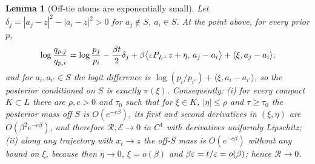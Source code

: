 \documentclass{article} %
\theoremstyle{plain}
\newtheorem{lemma}[theorem]{Lemma}
\theoremstyle{definition}
\theoremstyle{remark}
\begin{document}
\begin{lemma}[Off-tie atoms are exponentially small]
\label{lem:offtie}
Let $\delta_j=|a_j-z|^2-|a_i-z|^2>0$ for $a_j\notin S$, $a_i\in S$. At the point above, for every
prior $p$,
\[
\log\frac{q_{p,j}}{q_{p,i}}=\log\frac{p_j}{p_i}-\frac{\beta t}2\delta_j
+\beta\big\langle\varepsilon P_{L^\perp}z+\eta,\,a_j-a_i\big\rangle+\langle\xi,a_j-a_i\rangle,
\]
and for $a_i,a_{i'}\in S$ the logit difference is $\log(p_i/p_{i'})+\langle\xi,a_i-a_{i'}\rangle$, so the
posterior conditioned on $S$ is exactly $\pi(\xi)$. Consequently: (i) for every compact
$K\subset L$ there are $\rho,c>0$ and $\tau_0$ such that for $\xi\in K$, $|\eta|\le\rho$ and
$\tau\ge\tau_0$ the posterior mass off $S$ is $O(e^{-c\beta})$, its first and second derivatives
in $(\xi,\eta)$ are $O(\beta^2e^{-c\beta})$, and therefore $\mathcal R,\mathcal E\to0$ in $C^1$ with
derivatives uniformly Lipschitz; (ii) along any trajectory with $x_t\to z$ the off-$S$ mass is
$O(e^{-c\beta})$ without any bound on $\xi$, because then $\eta\to0$, $\xi=o(\beta)$ and
$\beta\varepsilon=t/\varepsilon=o(\beta)$; hence $\mathcal R\to0$.
\end{lemma}
\end{document}
